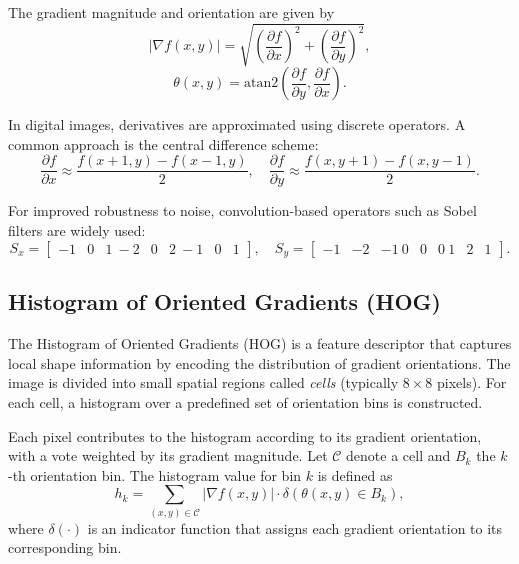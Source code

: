 \documentclass{elsarticle}
\begin{document}
The gradient magnitude and orientation are given by
\begin{equation}
	|\nabla f(x,y)| = \sqrt{ \left( \frac{\partial f}{\partial x} \right)^2 + \left( \frac{\partial f}{\partial y} \right)^2 },
\end{equation}
\begin{equation}
	\theta(x,y) = \mathrm{atan2} \left( \frac{\partial f}{\partial y}, \frac{\partial f}{\partial x} \right).
\end{equation}

In digital images, derivatives are approximated using discrete operators. A common approach is the central difference scheme:
\begin{equation}
	\frac{\partial f}{\partial x} \approx \frac{f(x+1,y) - f(x-1,y)}{2}, \quad
	\frac{\partial f}{\partial y} \approx \frac{f(x,y+1) - f(x,y-1)}{2}.
\end{equation}

For improved robustness to noise, convolution-based operators such as Sobel filters are widely used:
\begin{equation}
	S_x =
	\begin{bmatrix}
		-1 & 0 & 1 \
		-2 & 0 & 2 \
		-1 & 0 & 1
	\end{bmatrix}, \quad
	S_y =
	\begin{bmatrix}
		-1 & -2 & -1 \
		0 & 0 & 0 \
		1 & 2 & 1
	\end{bmatrix}.
\end{equation}

\subsection{Histogram of Oriented Gradients (HOG)}

The Histogram of Oriented Gradients (HOG) is a feature descriptor that captures local shape information by encoding the distribution of gradient orientations. The image is divided into small spatial regions called \textit{cells} (typically $8 \times 8$ pixels). For each cell, a histogram over a predefined set of orientation bins is constructed.

Each pixel contributes to the histogram according to its gradient orientation, with a vote weighted by its gradient magnitude. Let $ \mathcal{C} $ denote a cell and $ B_k $ the $k$-th orientation bin. The histogram value for bin $k$ is defined as
\begin{equation}
	h_k = \sum_{(x,y) \in \mathcal{C}} |\nabla f(x,y)| \cdot \delta(\theta(x,y) \in B_k),
\end{equation}
where $ \delta(\cdot) $ is an indicator function that assigns each gradient orientation to its corresponding bin.
\end{document}
